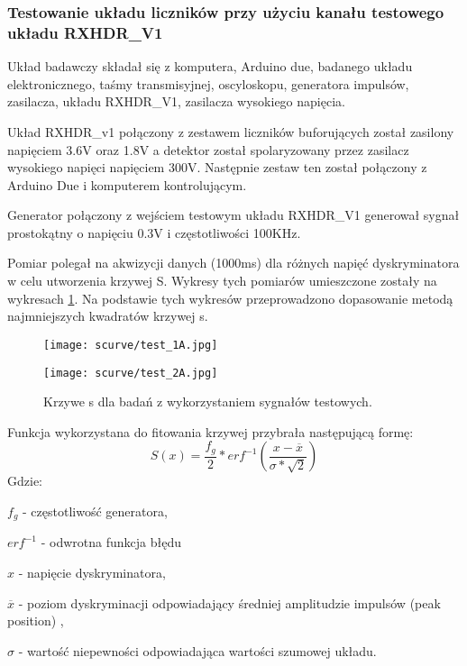 \subsubsection{Testowanie układu liczników przy użyciu kanału testowego układu RXHDR\_V1}
\label{section RXHDR test}

Układ badawczy składał się z komputera, Arduino due, badanego układu elektronicznego, taśmy transmisyjnej, oscyloskopu, generatora impulsów, zasilacza, układu RXHDR\_V1, zasilacza wysokiego napięcia. 

Układ RXHDR\_v1 połączony z zestawem liczników buforujących został zasilony napięciem 3.6V oraz 1.8V a detektor został spolaryzowany przez zasilacz wysokiego napięci napięciem 300V. Następnie zestaw ten został połączony z Arduino Due i komputerem kontrolującym. 

Generator połączony z wejściem testowym układu RXHDR\_V1 generował sygnał prostokątny o napięciu 0.3V i częstotliwości 100KHz. 

Pomiar polegał na akwizycji danych (1000ms) dla różnych napięć dyskryminatora w celu utworzenia krzywej S. Wykresy tych pomiarów umieszczone zostały na wykresach \ref{s curve test}. Na podstawie tych wykresów przeprowadzono dopasowanie metodą najmniejszych kwadratów krzywej s.

\begin{figure}
        \centering
        \begin{multicols}{2}
                \texttt{[image: scurve/test\_1A.jpg]} \par
                \texttt{[image: scurve/test\_2A.jpg]} \par
        \end{multicols}
        \caption{Krzywe s dla badań z wykorzystaniem sygnałów testowych.}\label{s curve test}
\end{figure}

Funkcja wykorzystana do fitowania krzywej przybrała następującą formę:
\begin{equation}
        \label{test eq}
        S(x) = \frac{f_g}{2} * erf^{-1}(\frac{x-\overline{x}}{\sigma*\sqrt{2}})
\end{equation}
Gdzie:
\begin{description}
        \item $f_g$ - częstotliwość generatora,
        \item $erf^{-1}$ - odwrotna funkcja błędu
        \item $x$ - napięcie dyskryminatora,
        \item $\overline{x}$ - poziom dyskryminacji odpowiadający średniej amplitudzie impulsów (peak position) ,
        \item  $\sigma$ - wartość niepewności odpowiadająca wartości szumowej układu. 
\end{description}

